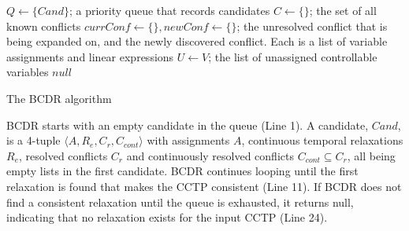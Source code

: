 \documentclass[jair,twoside,11pt,theapa]{article}
\begin{document}
	
\begin{algorithm}[h!]
		
\SetAlgoLined
{}
\Indm
{}
\Initialize{}
\;
{$Q\leftarrow\{\mathit{Cand}\}$; a priority queue that records candidates}\;
{$C\leftarrow\{\}$; the set of all known conflicts}\;
{$\mathit{currConf}\leftarrow \{\}, \mathit{newConf}\leftarrow \{\}$; the unresolved conflict that is being expanded on, and the newly discovered conflict. Each is a list of variable assignments and linear expressions}\;
{$U\leftarrow V$; the list of unassigned controllable variables}\;
\Indm
\Algorithm{}
\Indp
{}
\Return $null$\;
\caption{The BCDR algorithm}
\label{alg:bcdr}
\end{algorithm}

BCDR starts with an empty candidate in the queue (Line 1). A candidate, $\mathit{Cand}$,
is a 4-tuple $\langle A,R_e,C_r,C_{cont}\rangle $ with assignments $A$, continuous temporal
relaxations $R_e$, resolved conflicts $C_r$ and continuously resolved conflicts
$C_{cont}\subseteq C_r$, all being empty lists in the first candidate. BCDR
continues looping until the first relaxation is found that makes the CCTP
consistent (Line 11). If BCDR does not find a consistent relaxation until the
queue is exhausted, it returns null, indicating that no relaxation exists for the
input CCTP (Line 24).
\end{document}
